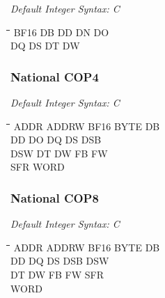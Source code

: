 {\em Default Integer Syntax: C}

{\tt\begin{tabbing}
\hspace{3cm}\=\hspace{3cm}\=\hspace{3cm}\=\hspace{3cm}\=\kill
BF16       \> DB         \> DD          \> DN          \> DO \\
DQ         \> DS         \> DT          \> DW \\
\end{tabbing}}
        
\subsubsection{National COP4}

{\em Default Integer Syntax: C}

{\tt\begin{tabbing}
\hspace{3cm}\=\hspace{3cm}\=\hspace{3cm}\=\hspace{3cm}\=\kill
ADDR       \> ADDRW       \> BF16        \> BYTE        \> DB \\
DD         \> DO          \> DQ          \> DS          \> DSB \\
DSW        \> DT          \> DW          \> FB          \> FW \\
SFR        \> WORD \\
\end{tabbing}}

\subsubsection{National COP8}

{\em Default Integer Syntax: C}

{\tt\begin{tabbing}
\hspace{3cm}\=\hspace{3cm}\=\hspace{3cm}\=\hspace{3cm}\=\kill
ADDR       \> ADDRW       \> BF16        \> BYTE        \> DB \\
DD         \> DQ          \> DS          \> DSB         \> DSW \\
DT         \> DW          \> FB          \> FW          \> SFR \\
WORD \\
\end{tabbing}}

